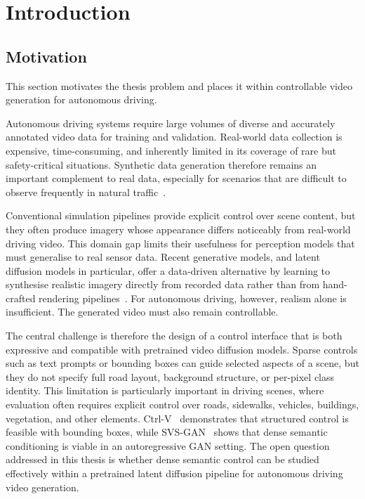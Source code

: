 \chapter{Introduction}
\label{ch:introduction}

\section{Motivation}
\label{sec:motivation}

This section motivates the thesis problem and places it within controllable video generation for autonomous driving.

Autonomous driving systems require large volumes of diverse and accurately annotated video data for training and validation. Real-world data collection is expensive, time-consuming, and inherently limited in its coverage of rare but safety-critical situations. Synthetic data generation therefore remains an important complement to real data, especially for scenarios that are difficult to observe frequently in natural traffic~\cite{li2023drivingdiffusion,hu2023gaia}.

Conventional simulation pipelines provide explicit control over scene content, but they often produce imagery whose appearance differs noticeably from real-world driving video. This domain gap limits their usefulness for perception models that must generalise to real sensor data. Recent generative models, and latent diffusion models in particular, offer a data-driven alternative by learning to synthesise realistic imagery directly from recorded data rather than from hand-crafted rendering pipelines~\cite{ho2020denoising,rombach2022highresolution,blattmann2023stable}. For autonomous driving, however, realism alone is insufficient. The generated video must also remain controllable.

The central challenge is therefore the design of a control interface that is both expressive and compatible with pretrained video diffusion models. Sparse controls such as text prompts or bounding boxes can guide selected aspects of a scene, but they do not specify full road layout, background structure, or per-pixel class identity. This limitation is particularly important in driving scenes, where evaluation often requires explicit control over roads, sidewalks, vehicles, buildings, vegetation, and other elements. Ctrl-V~\cite{luo2025ctrlv} demonstrates that structured control is feasible with bounding boxes, while SVS-GAN~\cite{seyam2024svsgan} shows that dense semantic conditioning is viable in an autoregressive GAN setting. The open question addressed in this thesis is whether dense semantic control can be studied effectively within a pretrained latent diffusion pipeline for autonomous driving video generation.

